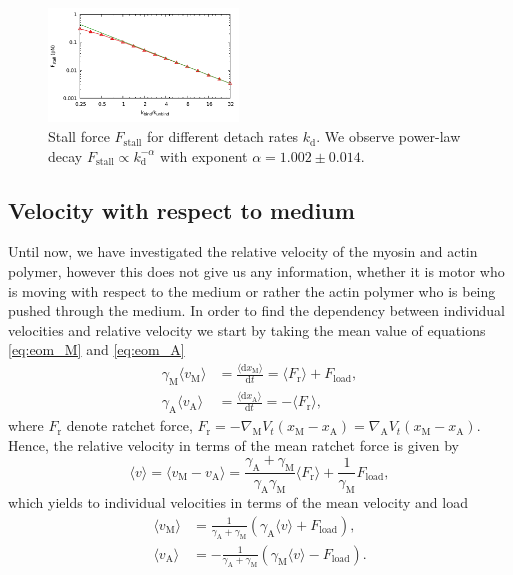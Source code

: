 \documentclass[aps,pre,twocolumn,showpacs,showkeys,superscriptaddress,floatfix]{revtex4-1}
\newcommand{\rmd}{{\mathrm d}}
\begin{document}
\begin{figure}[t]
\centering
\includegraphics[width=0.45\textwidth,height=!]{k_Fstall}
\caption{
\label{fig:k_Fstall} 
Stall force $F_\text{stall}$ for different detach rates $k_\text{d}$.
We observe power-law decay $F_\text{stall} \propto k_\text{d}^{-\alpha}$ with exponent $\alpha = 1.002 \pm 0.014$. 
}
\end{figure}

\subsection{Velocity with respect to medium}
\label{sec:ind_velo}
Until now, we have investigated the relative velocity of the myosin and actin polymer, however this does not give us any information,
whether it is motor who is moving with respect to the medium or rather the actin polymer who is being pushed through the medium.
In order to find the dependency between individual velocities and relative velocity we start by taking the mean value of equations \eqref{eq:eom_M} and \eqref{eq:eom_A}
\begin{align}
\gamma_\text{M} \langle v_\text{M} \rangle &= \frac{ \langle \rmd x_\text{M} \rangle }{\rmd t} = \langle F_\text{r} \rangle + F_\text{load} , \label{eq:pre_velocity_M} \\
\gamma_\text{A} \langle v_\text{A} \rangle &= \frac{ \langle \rmd x_\text{A} \rangle }{\rmd t} = -\langle F_\text{r} \rangle , \label{eq:pre_velocity_A}
\end{align}
where $F_\text{r}$ denote ratchet force, 
$F_\text{r} = - \nabla_\text{M} V_t( x_\text{M} - x_\text{A} ) = \nabla_\text{A} V_t(x_\text{M} - x_\text{A} )$. 
Hence, the relative velocity in terms of the mean ratchet force is given by 
\begin{equation*}
\langle v \rangle 
= \langle v_\text{M} - v_\text{A} \rangle 
= \frac{\gamma_\text{A} + \gamma_\text{M}}{\gamma_\text{A} \gamma_\text{M}} \langle F_\text{r} \rangle + \frac{1}{\gamma_\text{M}} F_\text{load} ,
\end{equation*}
which yields to individual velocities in terms of the mean velocity and load 
\begin{align}
\langle v_\text{M} \rangle &= \frac{1}{ \gamma_\text{A} + \gamma_\text{M} } \left( \gamma_\text{A} \langle v \rangle + F_\text{load} \right) ,
\label{eq:velocity_M} \\
\langle v_\text{A} \rangle &= -\frac{1}{ \gamma_\text{A} + \gamma_\text{M} } \left( \gamma_\text{M} \langle v \rangle - F_\text{load} \right) .
\label{eq:velocity_A}
\end{align}
\end{document}
